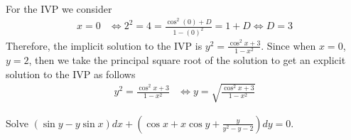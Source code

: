 \documentclass[notes]{subfiles}
\begin{document}
\begin{solution}
\begin{align*}
    \end{align*}
    For the IVP we consider
    \begin{align*}
        x = 0
        &\iff 2^2 = 4 = \frac{\cos^2 (0) + D}{1 - (0)^2} = 1 + D
        \iff D = 3
    \end{align*}
    Therefore, the implicit solution to the IVP is $y^2 = \frac{\cos^2 x + 3}{1 - x^2}$.
    Since when $x = 0$, $y = 2$, then we take the principal square root of the solution to get an explicit solution to the IVP as follows
    \begin{align*}
        y^2 = \frac{\cos^2 x + 3}{1 - x^2}
        &\iff y = \sqrt{\frac{\cos^2 x + 3}{1 - x^2}}
    \end{align*}
\end{solution}

\begin{exercise}
    Solve $(\sin y - y\sin x)dx + \left(\cos x + x\cos y + \frac{y}{y^2 - y - 2}\right)dy = 0$.
\end{exercise}
\end{document}
